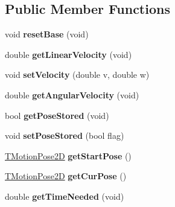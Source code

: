 \subsection*{Public Member Functions}
\begin{DoxyCompactItemize}
\item 
\mbox{\label{classmotion_1_1CActionBase_ab64789ff634b40a7c88771186deb02b3}} 
void {\bfseries reset\+Base} (void)
\item 
\mbox{\label{classmotion_1_1CActionBase_ad8f7083a38f4c2068be4f1f3ff63d9b4}} 
double {\bfseries get\+Linear\+Velocity} (void)
\item 
\mbox{\label{classmotion_1_1CActionBase_a1b0cf24115b28a95a27ee1613b4ca638}} 
void {\bfseries set\+Velocity} (double v, double w)
\item 
\mbox{\label{classmotion_1_1CActionBase_a6c91610ed7b320cfc5ed13cfea9494b5}} 
double {\bfseries get\+Angular\+Velocity} (void)
\item 
\mbox{\label{classmotion_1_1CActionBase_a5bfdf7bf03fd83920db673b15c64343c}} 
bool {\bfseries get\+Pose\+Stored} (void)
\item 
\mbox{\label{classmotion_1_1CActionBase_a1e4ce35712fb80d112e93f4c0025a17a}} 
void {\bfseries set\+Pose\+Stored} (bool flag)
\item 
\mbox{\label{classmotion_1_1CActionBase_a9d1b28add4644d61e509ae37a13d2e1c}} 
\mbox{\hyperlink{structmotion_1_1TMotionPose2D}{T\+Motion\+Pose2D}} {\bfseries get\+Start\+Pose} ()
\item 
\mbox{\label{classmotion_1_1CActionBase_a83cc4165081911d639409978ab21c8d2}} 
\mbox{\hyperlink{structmotion_1_1TMotionPose2D}{T\+Motion\+Pose2D}} {\bfseries get\+Cur\+Pose} ()
\item 
\mbox{\label{classmotion_1_1CActionBase_a5fab5515a22960387aec3e3edd3dc6d8}} 
double {\bfseries get\+Time\+Needed} (void)
\item 

\end{DoxyCompactItemize}
